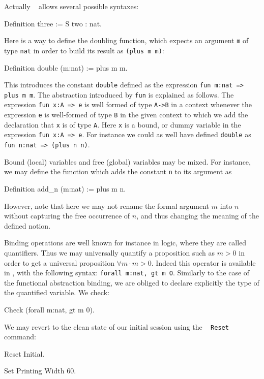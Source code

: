\documentclass[11pt,a4paper]{book}
\begin{document}
Actually \Coq~ allows several possible syntaxes:
\begin{coq_example}
Definition three := S two : nat.
\end{coq_example}

Here is a way to define the doubling function, which expects an
argument \verb:m: of type \verb:nat: in order to build its result as
\verb:(plus m m)::

\begin{coq_example}
Definition double (m:nat) := plus m m.
\end{coq_example}
This introduces the constant \texttt{double} defined as the
expression \texttt{fun m:nat => plus m m}.
The abstraction introduced by \texttt{fun} is explained as follows. The expression
\verb+fun x:A => e+ is well formed of type \verb+A->B+ in a context
whenever the expression \verb+e+ is well-formed of type \verb+B+ in 
the given context to which we add the declaration that \verb+x+
is of type \verb+A+. Here \verb+x+ is a bound, or dummy variable in
the expression \verb+fun x:A => e+. For instance we could as well have
defined \verb:double: as \verb+fun n:nat => (plus n n)+.

Bound (local) variables and free (global) variables may be mixed.
For instance, we may define the function which adds the constant \verb:n:
to its argument as
\begin{coq_example}
Definition add_n (m:nat) := plus m n.
\end{coq_example}
However, note that here we may not rename the formal argument $m$ into $n$
without capturing the free occurrence of $n$, and thus changing the meaning
of the defined notion.

Binding operations are well known for instance in logic, where they
are called quantifiers.  Thus we may universally quantify a
proposition such as $m>0$ in order to get a universal proposition
$\forall m\cdot m>0$. Indeed this operator is available in \Coq, with
the following syntax: \verb+forall m:nat, gt m O+. Similarly to the
case of the functional abstraction binding, we are obliged to declare
explicitly the type of the quantified variable. We check:
\begin{coq_example}
Check (forall m:nat, gt m 0).
\end{coq_example}
We may revert to the clean state of
our initial session using the \Coq~ \verb:Reset: command:
\begin{coq_example}
Reset Initial.
\end{coq_example}
\begin{coq_eval}
Set Printing Width 60.
\end{coq_eval}
\end{document}

